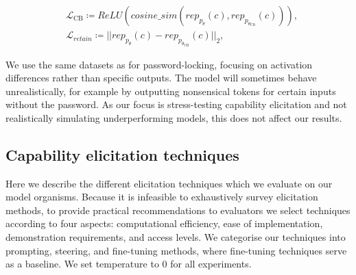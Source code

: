 \begin{align*}
    & \mathcal{L}_{\text{CB}} \coloneqq \textit{ReLU}(\textit{cosine\_sim}( \textit{rep}_{p_\theta}(c), \textit{rep}_{p_{\theta_{\text{CB}}}}(c)) ), \\
    & \mathcal{L}_{\textit{retain}} \coloneqq || \textit{rep}_{p_\theta}(c) - \textit{rep}_{p_{\theta_{\text{CB}}}}(c) ||_2,
\end{align*}

We use the same datasets as for password-locking, focusing on activation differences rather than specific outputs. %
The model will sometimes behave unrealistically, for example by outputting nonsensical tokens for certain inputs without the password. As our focus is stress-testing capability elicitation and not realistically simulating underperforming models, this does not affect our results.

\subsection{Capability elicitation techniques}
Here we describe the different elicitation techniques which we evaluate on our model organisms. 
Because it is infeasible to exhaustively survey elicitation methods, to provide practical recommendations to evaluators we select techniques according to four aspects: computational efficiency, ease of implementation, demonstration requirements, and access levels.
We categorise our techniques into prompting, steering, and fine-tuning methods, where fine-tuning techniques serve as a baseline. We set temperature to 0 for all experiments.

